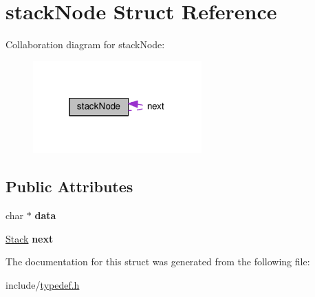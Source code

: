 \hypertarget{structstackNode}{}\section{stack\+Node Struct Reference}
\label{structstackNode}


Collaboration diagram for stack\+Node\+:\nopagebreak
\begin{figure}[H]
\begin{center}
\leavevmode
\includegraphics[width=184pt]{structstackNode__coll__graph}
\end{center}
\end{figure}
\subsection*{Public Attributes}
\begin{DoxyCompactItemize}
\item 
char $\ast$ {\bfseries data}\hypertarget{structstackNode_ab8a7f2b607f656ddbdaed84d1c5acbae}{}\label{structstackNode_ab8a7f2b607f656ddbdaed84d1c5acbae}

\item 
\hyperlink{structstackNode}{Stack} {\bfseries next}\hypertarget{structstackNode_a7225663fc2f1d3bad4623de65857c461}{}\label{structstackNode_a7225663fc2f1d3bad4623de65857c461}

\end{DoxyCompactItemize}


The documentation for this struct was generated from the following file\+:\begin{DoxyCompactItemize}
\item 
include/\hyperlink{typedef_8h}{typedef.\+h}\end{DoxyCompactItemize}
